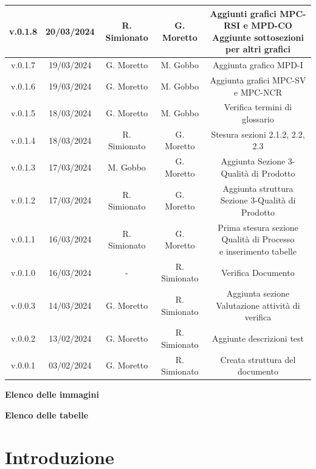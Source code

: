 \documentclass[5pt]{article}
\begin{document}
\begin{table}[H]
{\begin{tabular}{|c|c|c|c|c|}
				\hline
				v.0.1.8 & 20/03/2024 & R. Simionato & G. Moretto & \shortstack{Aggiunti grafici MPC-RSI e MPD-CO\\Aggiunte sottosezioni per altri grafici} \\
				\hline
				v.0.1.7 & 19/03/2024 & G. Moretto & M. Gobbo & Aggiunta grafico MPD-I \\
				\hline
				v.0.1.6 & 19/03/2024 & G. Moretto & M. Gobbo & Aggiunta grafici MPC-SV e MPC-NCR \\
				\hline
				v.0.1.5 & 18/03/2024 & G. Moretto & M. Gobbo & Verifica termini di glossario \\
				\hline
				v.0.1.4 & 18/03/2024 & R. Simionato & G. Moretto & Stesura sezioni 2.1.2, 2.2, 2.3 \\
				\hline
				v.0.1.3 & 17/03/2024 & M. Gobbo & G. Moretto & Aggiunta Sezione 3-Qualità di Prodotto \\
				\hline
				v.0.1.2 & 17/03/2024 & R. Simionato & G. Moretto & Aggiunta struttura Sezione 3-Qualità di Prodotto \\
				\hline
				v.0.1.1 & 16/03/2024 & R. Simionato & G. Moretto & \shortstack{Prima stesura sezione Qualità di Processo\\e inserimento tabelle} \\
				\hline
				v.0.1.0 & 16/03/2024 & - & R. Simionato & Verifica Documento \\
				\hline
				v.0.0.3 & 14/03/2024 & G. Moretto & R. Simionato & Aggiunta sezione Valutazione attività di verifica \\
				\hline
				v.0.0.2 & 13/02/2024 & G. Moretto & R. Simionato  &  Aggiunte descrizioni test\\
				\hline
				v.0.0.1 & 03/02/2024 & G. Moretto & R. Simionato  & Creata struttura del documento \\
				\hline
	   		\end{tabular}
		}
	 	\label{tab:conference}
    \end{table}

	\pagebreak
	\tableofcontents
	\pagebreak

	\textbf{\Large Elenco delle immagini} \\
	\makeatletter
	\makeatother
	
	\pagebreak
	\textbf{\Large Elenco delle tabelle} \\
	\makeatletter
	\makeatother
	
	\pagebreak
	
	\section{Introduzione}
	
\end{document}
